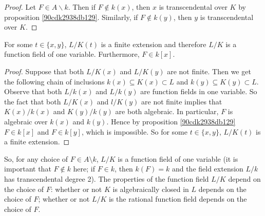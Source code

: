 \begin{proof}
	Let $F \in A \backslash  k$. Then if $F \notin  k(x)$, then $x$ is 
	transcendental over $K$ by proposition \ref{90cdk2938db129}. Similarly, 
	if $F\notin  k(y)$, then $y$ is transcendental over $K$. 
\end{proof}

\begin{proposition}
	For some $t \in \{x,y\}$, $L/K(t)$ is a finite extension and therefore
	$L/K$ is a function field of one variable.
	Furthermore, $F \in  k[x]$.
\end{proposition}

\begin{proof}
	Suppose that both $L/K(x)$ and $L/K(y)$ are not finite. Then we get the following
	chain of inclusions $ k(x) \subseteq K(x) \subset L$ and $ k(y) \subseteq K(y) \subset L$. 
	Observe that both $L/ k(x)$ and $L/ k(y)$ are function fields in one 
	variable. So the fact that both $L/K(x)$ and $l/K(y)$ are not finite implies 
	that $K(x)/ k(x)$ and $K(y)/ k(y)$ are both algebraic. In particular,
	$F$ is algebraic over $ k(x)$ and $ k(y)$. Hence by proposition \ref{90cdk2938db129}
	$F\in  k[x]$ and $F\in  k[y]$, which is impossible. So for some $t \in \{x,y\}$, $L/K(t)$ is a finite extension.
\end{proof}

\begin{remark}
	So, for any choice of $F \in A \setminus  k$, $L/K$ is a function field of one variable
	(it is important that $F \notin  k$ here; 
	if $F \in  k$, then $ k(F)= k$ and the field extension $L/ k$ has transcendental degree 2).
	The properties of the function field $L/K$ depend on the choice of $F$:
	whether or not $K$ is algebraically closed in $L$ depends on the choice of $F$;
	whether or not $L/K$ is the rational function field depends on the choice of $F$.
\end{remark}


